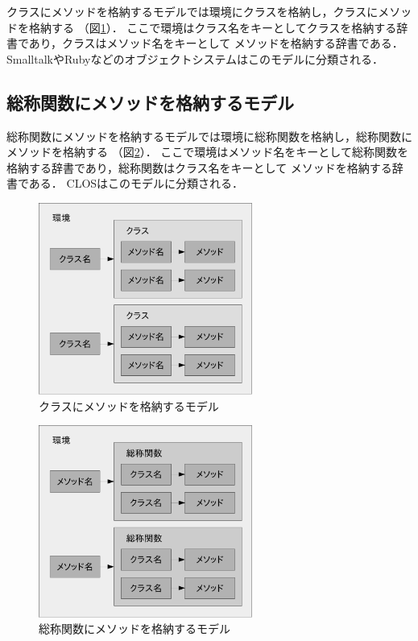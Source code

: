 \documentclass[withpage]{ipsjprosym}  %
\begin{document}
クラスにメソッドを格納するモデルでは環境にクラスを格納し，クラスにメソッドを格納する
（図\ref{fig:classes}）．
ここで環境はクラス名をキーとしてクラスを格納する辞書であり，クラスはメソッド名をキーとして
メソッドを格納する辞書である．
SmalltalkやRubyなどのオブジェクトシステムはこのモデルに分類される．


\subsection{総称関数にメソッドを格納するモデル}

総称関数にメソッドを格納するモデルでは環境に総称関数を格納し，総称関数にメソッドを格納する
（図\ref{fig:generic-functions}）．
ここで環境はメソッド名をキーとして総称関数を格納する辞書であり，総称関数はクラス名をキーとして
メソッドを格納する辞書である．
CLOSはこのモデルに分類される．

\begin{figure}
\centering
\includegraphics[width=7cm]{fig/classes-crop.pdf}
\caption{クラスにメソッドを格納するモデル}
\label{fig:classes}
\end{figure}

\begin{figure}
\centering
\includegraphics[width=7cm]{fig/generic-functions-crop.pdf}
\caption{総称関数にメソッドを格納するモデル}
\label{fig:generic-functions}
\end{figure}
\end{document}
